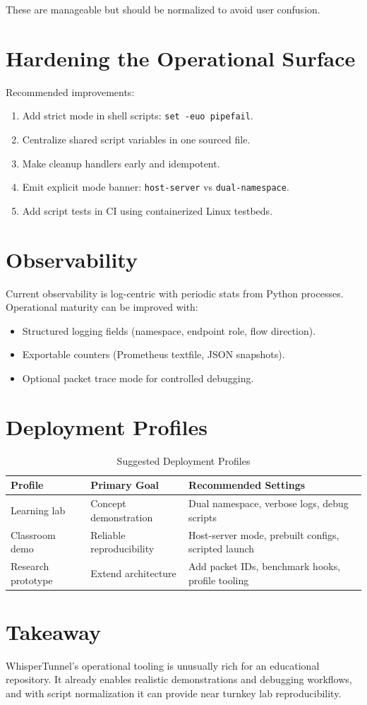 These are manageable but should be normalized to avoid user confusion.

\section{Hardening the Operational Surface}
Recommended improvements:
\begin{enumerate}[leftmargin=2em]
\item Add strict mode in shell scripts: \texttt{set -euo pipefail}.
\item Centralize shared script variables in one sourced file.
\item Make cleanup handlers early and idempotent.
\item Emit explicit mode banner: \texttt{host-server} vs \texttt{dual-namespace}.
\item Add script tests in CI using containerized Linux testbeds.
\end{enumerate}

\section{Observability}
Current observability is log-centric with periodic stats from Python processes. Operational maturity can be improved with:
\begin{itemize}[leftmargin=2em]
\item Structured logging fields (namespace, endpoint role, flow direction).
\item Exportable counters (Prometheus textfile, JSON snapshots).
\item Optional packet trace mode for controlled debugging.
\end{itemize}

\section{Deployment Profiles}
\begin{table}[H]
\centering
\caption{Suggested Deployment Profiles}
\begin{tabular}{p{}p{}p{}}
\toprule
\textbf{Profile} & \textbf{Primary Goal} & \textbf{Recommended Settings} \\
\midrule
Learning lab & Concept demonstration & Dual namespace, verbose logs, debug scripts \\
Classroom demo & Reliable reproducibility & Host-server mode, prebuilt configs, scripted launch \\
Research prototype & Extend architecture & Add packet IDs, benchmark hooks, profile tooling \\
\bottomrule
\end{tabular}
\end{table}

\section{Takeaway}
WhisperTunnel's operational tooling is unusually rich for an educational repository. It already enables realistic demonstrations and debugging workflows, and with script normalization it can provide near turnkey lab reproducibility.
